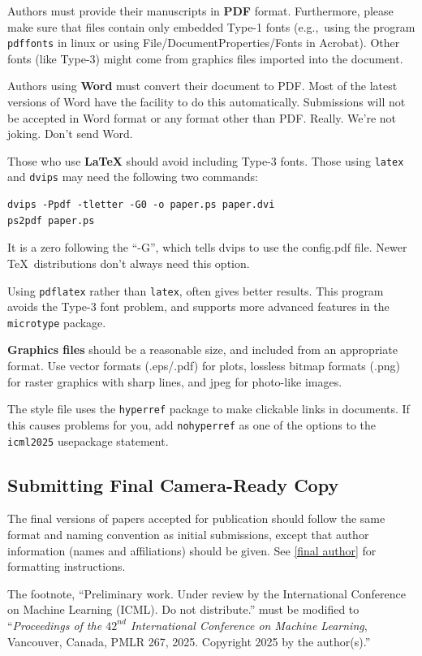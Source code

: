\documentclass{article}
\theoremstyle{plain}
\theoremstyle{definition}
\theoremstyle{remark}
\begin{document}
Authors must provide their manuscripts in \textbf{PDF} format.
Furthermore, please make sure that files contain only embedded Type-1 fonts
(e.g.,~using the program \texttt{pdffonts} in linux or using
File/DocumentProperties/Fonts in Acrobat). Other fonts (like Type-3)
might come from graphics files imported into the document.

Authors using \textbf{Word} must convert their document to PDF\@. Most
of the latest versions of Word have the facility to do this
automatically. Submissions will not be accepted in Word format or any
format other than PDF\@. Really. We're not joking. Don't send Word.

Those who use \textbf{\LaTeX} should avoid including Type-3 fonts.
Those using \texttt{latex} and \texttt{dvips} may need the following
two commands:

{\footnotesize
\begin{verbatim}
dvips -Ppdf -tletter -G0 -o paper.ps paper.dvi
ps2pdf paper.ps
\end{verbatim}}
It is a zero following the ``-G'', which tells dvips to use
the config.pdf file. Newer \TeX\ distributions don't always need this
option.

Using \texttt{pdflatex} rather than \texttt{latex}, often gives better
results. This program avoids the Type-3 font problem, and supports more
advanced features in the \texttt{microtype} package.

\textbf{Graphics files} should be a reasonable size, and included from
an appropriate format. Use vector formats (.eps/.pdf) for plots,
lossless bitmap formats (.png) for raster graphics with sharp lines, and
jpeg for photo-like images.

The style file uses the \texttt{hyperref} package to make clickable
links in documents. If this causes problems for you, add
\texttt{nohyperref} as one of the options to the \texttt{icml2025}
usepackage statement.


\subsection{Submitting Final Camera-Ready Copy}

The final versions of papers accepted for publication should follow the
same format and naming convention as initial submissions, except that
author information (names and affiliations) should be given. See
\cref{final author} for formatting instructions.

The footnote, ``Preliminary work. Under review by the International
Conference on Machine Learning (ICML). Do not distribute.'' must be
modified to ``\textit{Proceedings of the
$\mathit{42}^{nd}$ International Conference on Machine Learning},
Vancouver, Canada, PMLR 267, 2025.
Copyright 2025 by the author(s).''
\end{document}
